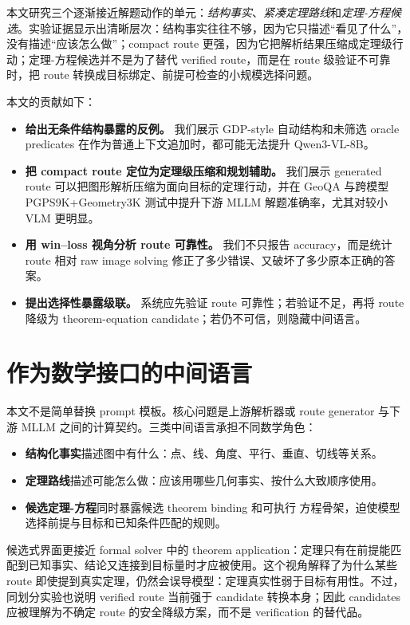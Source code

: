 \documentclass[UTF8,11pt,fontset=fandol]{ctexart}
\begin{document}
本文研究三个逐渐接近解题动作的单元：\emph{结构事实}、\emph{紧凑定理路线}和\emph{定理-方程候选}。实验证据显示出清晰层次：结构事实往往不够，因为它只描述“看见了什么”，没有描述“应该怎么做”；compact route 更强，因为它把解析结果压缩成定理级行动；定理-方程候选并不是为了替代 verified route，而是在 route 级验证不可靠时，把 route 转换成目标绑定、前提可检查的小规模选择问题。

本文的贡献如下：
\begin{itemize}[leftmargin=*]
\item \textbf{给出无条件结构暴露的反例。} 我们展示 GDP-style 自动结构和未筛选 oracle predicates 在作为普通上下文追加时，都可能无法提升 Qwen3-VL-8B。
\item \textbf{把 compact route 定位为定理级压缩和规划辅助。} 我们展示 generated route 可以把图形解析压缩为面向目标的定理行动，并在 GeoQA 与跨模型 PGPS9K+Geometry3K 测试中提升下游 MLLM 解题准确率，尤其对较小 VLM 更明显。
\item \textbf{用 win--loss 视角分析 route 可靠性。} 我们不只报告 accuracy，而是统计 route 相对 raw image solving 修正了多少错误、又破坏了多少原本正确的答案。
\item \textbf{提出选择性暴露级联。} 系统应先验证 route 可靠性；若验证不足，再将 route 降级为 theorem-equation candidate；若仍不可信，则隐藏中间语言。
\end{itemize}

\section{作为数学接口的中间语言}
本文不是简单替换 prompt 模板。核心问题是上游解析器或 route generator 与下游 MLLM 之间的计算契约。三类中间语言承担不同数学角色：

\begin{itemize}[leftmargin=*]
\item \textbf{结构化事实}描述图中有什么：点、线、角度、平行、垂直、切线等关系。
\item \textbf{定理路线}描述可能怎么做：应该用哪些几何事实、按什么大致顺序使用。
\item \textbf{候选定理-方程}同时暴露候选 theorem binding 和可执行 方程骨架，迫使模型选择前提与目标和已知条件匹配的规则。
\end{itemize}

候选式界面更接近 formal solver 中的 theorem application：定理只有在前提能匹配到已知事实、结论又连接到目标量时才应被使用。这个视角解释了为什么某些 route 即使提到真实定理，仍然会误导模型：定理真实性弱于目标有用性。不过，同划分实验也说明 verified route 当前强于 candidate 转换本身；因此 candidates 应被理解为不确定 route 的安全降级方案，而不是 verification 的替代品。
\end{document}
